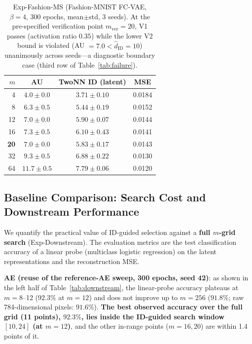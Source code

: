 \documentclass[make,article,submit,pdftex,moreauthors]{Definitions/mdpi}
\newcommand{\hatdID}{\hat{d}_{\mathrm{ID}}}
\begin{document}
\begin{table}[H]
\caption{Exp-Fashion-MS (Fashion-MNIST FC-VAE, $\beta = 4$, 300 epochs,
mean$\pm$std, 3 seeds). At the pre-specified verification point
$m_{\mathrm{ver}} = 20$, V1 passes (activation ratio $0.35$) while the
lower V2 bound is violated (AU $= 7.0 < \hatdID = 10$) unanimously across
seeds---a diagnostic boundary case (third row of Table~\ref{tab:failure}).}
\label{tab:fashion_s3}
\small
\begin{tabular}{rccc}
\toprule
$m$ & \textbf{AU} & \textbf{TwoNN ID (latent)} & \textbf{MSE} \\
\midrule
 4 & $4.0 \pm 0.0$ & $3.71 \pm 0.10$ & 0.0184 \\
 8 & $6.3 \pm 0.5$ & $5.44 \pm 0.19$ & 0.0152 \\
12 & $7.0 \pm 0.0$ & $5.90 \pm 0.07$ & 0.0144 \\
16 & $7.3 \pm 0.5$ & $6.10 \pm 0.43$ & 0.0141 \\
\textbf{20} & $\boldsymbol{7.0 \pm 0.0}$ & $5.83 \pm 0.17$ & 0.0143 \\
32 & $9.3 \pm 0.5$ & $6.88 \pm 0.22$ & 0.0130 \\
64 & $11.7 \pm 0.5$ & $7.79 \pm 0.06$ & 0.0120 \\
\bottomrule
\end{tabular}
\end{table}

\subsection{Baseline Comparison: Search Cost and Downstream Performance}\label{sec:exp_downstream}

We quantify the practical value of ID-guided selection against a
\textbf{full $m$-grid search} (Exp-Downstream).
The evaluation metrics are the test classification accuracy of a linear
probe (multiclass logistic regression) on the latent representations and the
reconstruction MSE.

\textbf{AE (reuse of the reference-AE sweep, 300 epochs, seed 42)}:
as shown in the left half of Table~\ref{tab:downstream},
the linear-probe accuracy plateaus at $m = 8$--12 ($92.3\%$ at $m = 12$)
and does not improve up to $m = 256$ ($91.8\%$; raw 784-dimensional pixels:
$91.6\%$).
\textbf{The best observed accuracy over the full grid (11 points),
$92.3\%$, lies inside the ID-guided search window $[10, 24]$ (at
$m = 12$)},
and the other in-range points ($m = 16, 20$) are within 1.4 points of it.
\end{document}
